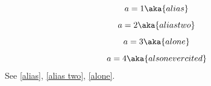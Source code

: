 \documentclass{article}
\begin{document}
\begin{equation} a=1 \label{real} \aka{alias} \end{equation}
\begin{equation} a=2 \aka{alias two} \label{real two} \end{equation}
\begin{equation} a=3 \aka{alone} \end{equation}
\begin{equation} a=4 \label{never cited} \aka{also never cited} \end{equation}
See \eqref{alias}, \eqref{alias two}, \eqref{alone}.
\end{document}
